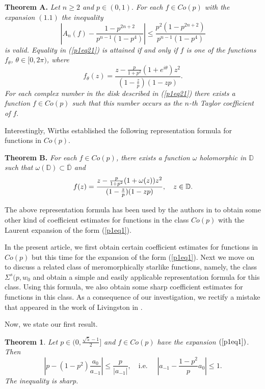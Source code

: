 \documentclass[leqno,
12pt]{amsart}
\newtheorem{thm}{Theorem}[section]
\theoremstyle{definition}
\begin{document}
\bigskip
\noindent
{\bf Theorem A.} {\rm \cite{A-wirths06}}
{\em Let $n\geq 2$ and $p\in (0,1).$ For each $f \in Co(p)$ with the expansion
$(1.1)$ the inequality
\begin{equation}\label{p1eq21}
\left|A_n(f)-\frac{1-p^{2n+2}}{p^{n-1}(1-p^4)}\right|\leq
\frac{p^2(1-p^{2n+2})}{p^{n-1}(1-p^4)}
\end{equation}
is valid. Equality in {\rm (\ref{p1eq21})} is attained if and only if $f$
is one of the functions $f_{\theta}$, $\theta \in [0, 2\pi)$, where
\begin{equation}\label{p1eq18aa}
f_{\theta}(z)=\frac{z-\frac{p}{1+p^2}(1+e^{i\theta})z^2}{(1-\frac{z}{p})(1-zp)}.
\end{equation}
For each complex number in the disk described in {\rm (\ref{p1eq21})} there
exists a function $f\in Co(p)$ such that this number occurs as the
$n$-th Taylor coefficient of $f.$
}
\bigskip

Interestingly,  Wirths  \cite{Wirths-pre} established the following
representation formula for functions in $Co(p)$.

\bigskip
\noindent
{\bf Theorem B.} {\rm \cite{Wirths-pre}}
{\em
For each $f\in Co(p)$, there exists a function $\omega$
holomorphic in ${{\mathbb D}}$ such that $\omega({{\mathbb D}})\subset \overline{{\mathbb D}}$ and
\begin{equation}\label{p1eq17}
f(z)=\frac{z-\frac{p}{1+p^2}(1+\omega(z))z^2}{(1-\frac{z}{p})(1-zp)},
\quad \mbox{$ z\in {{\mathbb D}} $}.
\end{equation}
}
\bigskip

The above representation formula
has been used by the authors in \cite{BPW1} to obtain some other
kind of coefficient estimates for functions in the class $Co(p)$
with the Laurent expansion of the form (\ref{p1eq1}).

In the present article, we first obtain certain coefficient estimates
for functions in $Co(p)$  but this time for the expansion of the form (\ref{p1eq1}).
Next we move on to discuss a related class of meromorphically
starlike functions, namely, the class $\Sigma^s(p, w_0$ and obtain
a simple and easily applicable
representation formula for this class. Using this formula, we also
obtain some sharp coefficient estimates for functions in this class.
As a consequence of our investigation, we rectify a mistake that appeared in
the work of Livingston in \cite[Theorem 9]{Living-94}.

Now, we state our first result.

\begin{thm}\label{1th1}
Let $p\in(0,\frac{\sqrt 5-1}{2}]$ and $f \in Co(p)$ have the expansion $(\ref{p1eq1})$.
Then
\begin{equation}\label{p1eq2}
\left |p-(1-p^2)\frac{a_0}{a_{-1}}
\right |\leq \frac{p}{|a_{-1}|} ,
\quad \mbox{i.e. }\quad
\left |a_{-1}-\frac{1-p^2}{p}a_0
\right |\leq 1.
\end{equation}
The inequality is sharp.
\end{thm}
\end{document}
